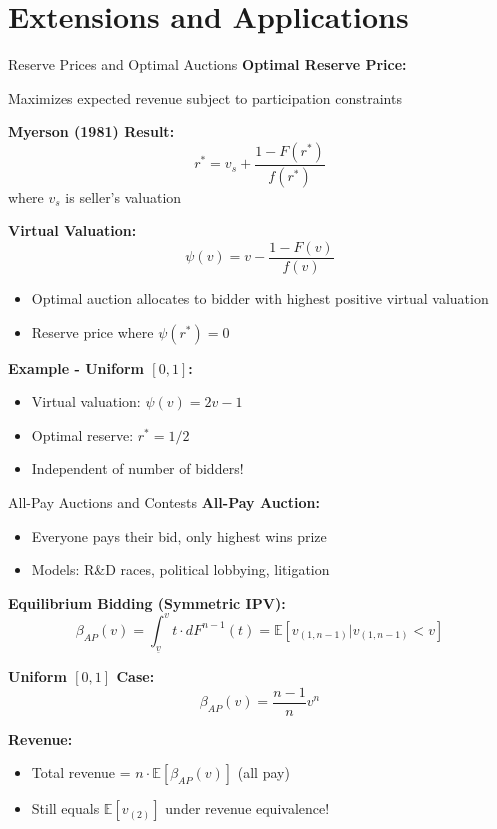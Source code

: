 \documentclass[xcolor={x11names}]{beamer}
\begin{document}
\section{Extensions and Applications}

\begin{frame}{Reserve Prices and Optimal Auctions}
\textbf{Optimal Reserve Price:}

Maximizes expected revenue subject to participation constraints


\textbf{Myerson (1981) Result:}
\[r^* = v_s + \frac{1-F(r^*)}{f(r^*)}\]
where $v_s$ is seller's valuation


\textbf{Virtual Valuation:}
\[\psi(v) = v - \frac{1-F(v)}{f(v)}\]

\begin{itemize}
  \item Optimal auction allocates to bidder with highest positive virtual valuation
  \item Reserve price where $\psi(r^*) = 0$
\end{itemize}


\textbf{Example - Uniform $[0,1]$:}
\begin{itemize}
  \item Virtual valuation: $\psi(v) = 2v - 1$
  \item Optimal reserve: $r^* = 1/2$
  \item Independent of number of bidders!
\end{itemize}
\end{frame}

\begin{frame}{All-Pay Auctions and Contests}
\textbf{All-Pay Auction:}
\begin{itemize}
  \item Everyone pays their bid, only highest wins prize
  \item Models: R\&D races, political lobbying, litigation
\end{itemize}


\textbf{Equilibrium Bidding (Symmetric IPV):}
\[\beta_{AP}(v) = \int_{\underline{v}}^v t \cdot dF^{n-1}(t) = \mathbb{E}[v_{(1,n-1)}|v_{(1,n-1)} < v]\]


\textbf{Uniform $[0,1]$ Case:}
\[\beta_{AP}(v) = \frac{n-1}{n}v^n\]

\textbf{Revenue:}
\begin{itemize}
  \item Total revenue = $n \cdot \mathbb{E}[\beta_{AP}(v)]$ (all pay)
  \item Still equals $\mathbb{E}[v_{(2)}]$ under revenue equivalence!
\end{itemize}
\end{frame}
\end{document}

